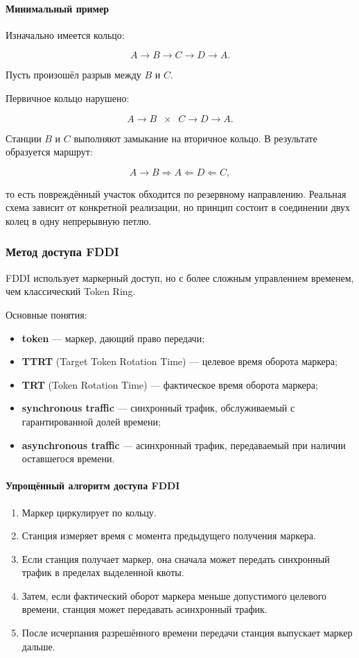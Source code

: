 \documentclass[12pt,a4paper]{article}
\begin{document}
\paragraph{Минимальный пример}

Изначально имеется кольцо:

\[
A \rightarrow B \rightarrow C \rightarrow D \rightarrow A.
\]

Пусть произошёл разрыв между $B$ и $C$.

Первичное кольцо нарушено:

\[
A \rightarrow B \;\; \times \;\; C \rightarrow D \rightarrow A.
\]

Станции $B$ и $C$ выполняют замыкание на вторичное кольцо. В результате образуется маршрут:

\[
A \rightarrow B \Rightarrow A \Leftarrow D \Leftarrow C,
\]

то есть повреждённый участок обходится по резервному направлению. Реальная схема зависит от конкретной реализации, но принцип состоит в соединении двух колец в одну непрерывную петлю.

\subsubsection{Метод доступа FDDI}

FDDI использует маркерный доступ, но с более сложным управлением временем, чем классический Token Ring.

Основные понятия:
\begin{itemize}
    \item \textbf{token} --- маркер, дающий право передачи;
    \item \textbf{TTRT} (Target Token Rotation Time) --- целевое время оборота маркера;
    \item \textbf{TRT} (Token Rotation Time) --- фактическое время оборота маркера;
    \item \textbf{synchronous traffic} --- синхронный трафик, обслуживаемый с гарантированной долей времени;
    \item \textbf{asynchronous traffic} --- асинхронный трафик, передаваемый при наличии оставшегося времени.
\end{itemize}

\paragraph{Упрощённый алгоритм доступа FDDI}

\begin{enumerate}
    \item Маркер циркулирует по кольцу.
    \item Станция измеряет время с момента предыдущего получения маркера.
    \item Если станция получает маркер, она сначала может передать синхронный трафик в пределах выделенной квоты.
    \item Затем, если фактический оборот маркера меньше допустимого целевого времени, станция может передавать асинхронный трафик.
    \item После исчерпания разрешённого времени передачи станция выпускает маркер дальше.
\end{enumerate}
\end{document}
